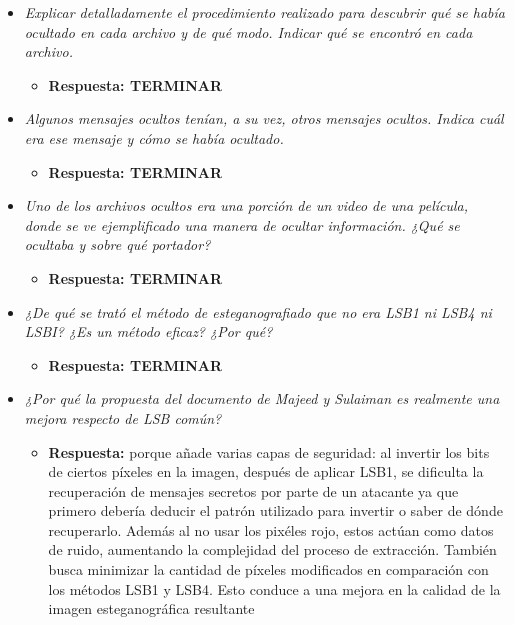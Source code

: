\documentclass[a4paper,12pt]{article}
\begin{document}
\begin{itemize}
\begin{itemize}
		\end{itemize}
		
		\item \textit{Explicar detalladamente el procedimiento realizado para descubrir qué se había ocultado en cada archivo y de qué modo. Indicar qué se encontró en cada archivo.}
		\begin{itemize}
			\item \textbf{Respuesta: TERMINAR} 
		\end{itemize}
		
		\item \textit{Algunos mensajes ocultos tenían, a su vez, otros mensajes ocultos. Indica cuál era ese mensaje y cómo se había ocultado.}
		\begin{itemize}
			\item \textbf{Respuesta: TERMINAR} 
		\end{itemize}
		
		\item \textit{Uno de los archivos ocultos era una porción de un video de una película, donde se ve ejemplificado una manera de ocultar información. ¿Qué se ocultaba y sobre qué portador?}
		\begin{itemize}
			\item \textbf{Respuesta: TERMINAR} 
		\end{itemize}
		
		\item \textit{¿De qué se trató el método de esteganografiado que no era LSB1 ni LSB4 ni LSBI? ¿Es un método eficaz? ¿Por qué?}
		\begin{itemize}
			\item \textbf{Respuesta: TERMINAR} 
		\end{itemize}
		
		\item \textit{¿Por qué la propuesta del documento de Majeed y Sulaiman es realmente una mejora respecto de LSB común?}
		\begin{itemize}
			\item \textbf{Respuesta:} porque añade varias capas de seguridad: al invertir los bits de ciertos píxeles en la imagen, después de aplicar LSB1, se dificulta la recuperación de mensajes secretos por parte de un atacante ya que primero debería deducir el patrón utilizado para invertir o saber de dónde recuperarlo. Además al no usar los pixéles rojo, estos actúan como datos de ruido, aumentando la complejidad del proceso de extracción. También busca minimizar la cantidad de píxeles modificados en comparación con los métodos LSB1 y LSB4. Esto conduce a una mejora en la calidad de la imagen esteganográfica resultante
		\end{itemize}
		

\end{itemize}
\end{document}
